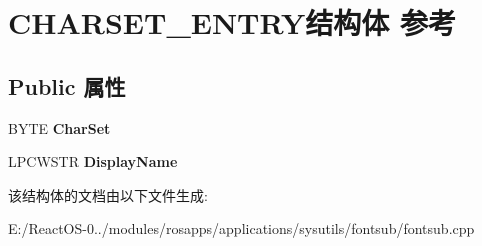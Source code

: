 \hypertarget{struct_c_h_a_r_s_e_t___e_n_t_r_y}{}\section{C\+H\+A\+R\+S\+E\+T\+\_\+\+E\+N\+T\+R\+Y结构体 参考}
\label{struct_c_h_a_r_s_e_t___e_n_t_r_y}
\subsection*{Public 属性}
\begin{DoxyCompactItemize}
\item 
\mbox{\label{struct_c_h_a_r_s_e_t___e_n_t_r_y_ae0085b77b9935db708f5b011e8cc5663}} 
B\+Y\+TE {\bfseries Char\+Set}
\item 
\mbox{\label{struct_c_h_a_r_s_e_t___e_n_t_r_y_ac9a1969a62648124e4003ecdd0a8245a}} 
L\+P\+C\+W\+S\+TR {\bfseries Display\+Name}
\end{DoxyCompactItemize}


该结构体的文档由以下文件生成\+:\begin{DoxyCompactItemize}
\item 
E\+:/\+React\+O\+S-\/0../modules/rosapps/applications/sysutils/fontsub/fontsub.\+cpp\end{DoxyCompactItemize}
